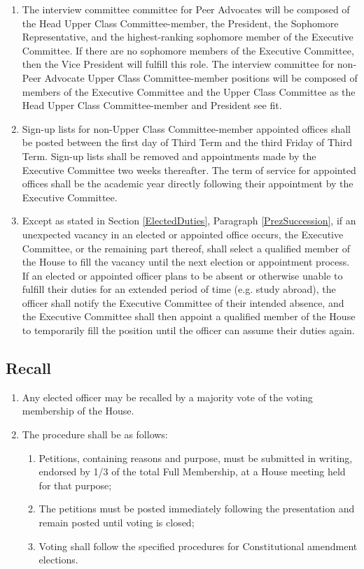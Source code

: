 \documentclass[10pt]{article} %
\begin{document}
\begin{enumerate}
\item The interview committee committee for Peer Advocates will be composed of the Head Upper Class Committee-member, the President, the Sophomore Representative, and the highest-ranking sophomore member of the Executive Committee. If there are no sophomore members of the Executive Committee, then the Vice President will fulfill this role. The interview committee for non-Peer Advocate Upper Class Committee-member positions will be composed of members of the Executive Committee and the Upper Class Committee as the Head Upper Class Committee-member and President see fit.
\item Sign-up lists for non-Upper Class Committee-member appointed offices shall be posted between the first day of Third Term and the third Friday of Third Term. Sign-up lists shall be removed and appointments made by the Executive Committee two weeks thereafter. The term of service for appointed offices shall be the academic year directly following their appointment by the Executive Committee.
\item Except as stated in Section \ref{ElectedDuties}, Paragraph \ref{PrezSuccession}, if an unexpected vacancy in an elected or appointed office occurs, the Executive Committee, or the remaining part thereof, shall select a qualified member of the House to fill the vacancy until the next election or appointment process. If an elected or appointed officer plans to be absent or otherwise unable to fulfill their duties for an extended period of time (e.g. study abroad), the officer shall notify the Executive Committee of their intended absence, and the Executive Committee shall then appoint a qualified member of the House to temporarily fill the position until the officer can assume their duties again.
\end{enumerate}
\subsection{Recall}
\begin{enumerate}
\item Any elected officer may be recalled by a majority vote of the voting membership of the House. 
\item The procedure shall be as follows:
\begin{enumerate}
\item Petitions, containing reasons and purpose, must be submitted in writing, endorsed by 1/3 of the total Full Membership, at a House meeting held for that purpose;
\item The petitions must be posted immediately following the presentation and remain posted until voting is closed;
\item Voting shall follow the specified procedures for Constitutional amendment elections.
\end{enumerate}
\end{enumerate}
\end{document}
